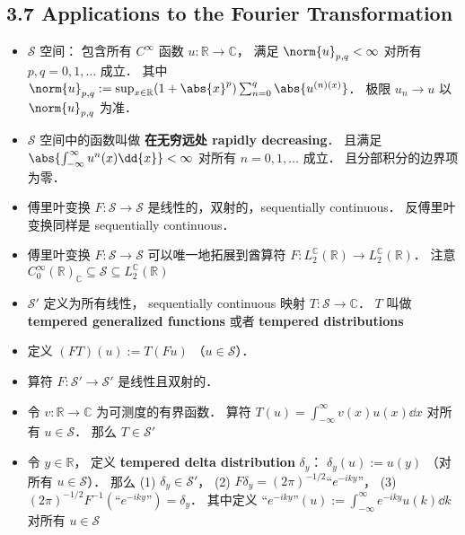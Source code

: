 \subsection{3.7 Applications to the Fourier Transformation}
\begin{itemize}
\item $\mathcal S$ 空间： 包含所有 $C^\infty$ 函数 $u: \mathbb R \to \mathbb C$， 满足 $\norm{u}_{p,q} < \infty$ 对所有 $p, q=0,1,\dots$ 成立． 其中 $\norm{u}_{p,q} := \sup_{x\in\mathbb R} (1+\abs{x}^p) \sum_{n=0}^q\abs{u^{(n)(x)}}$． 极限 $u_n \to u$ 以 $\norm{u}_{p,q}$ 为准．

\item $\mathcal S$ 空间中的函数叫做 \textbf{在无穷远处 rapidly decreasing}． 且满足 $\abs{\int_{-\infty}^\infty u^{n}(x) \dd{x}} < \infty$ 对所有 $n = 0, 1,\dots$ 成立． 且分部积分的边界项为零．

\item 傅里叶变换 $F:\mathcal S\to\mathcal S$ 是线性的，双射的，sequentially continuous． 反傅里叶变换同样是 sequentially continuous．

\item 傅里叶变换 $F:\mathcal S\to\mathcal S$ 可以唯一地拓展到酋算符 $F: L_2^{\mathbb C}(\mathbb R) \to L_2^{\mathbb C}(\mathbb R)$． 注意 $C_0^\infty(\mathbb R)_{\mathbb C} \subseteq \mathcal S \subseteq L_2^{\mathbb C}(\mathbb R)$

\item $\mathcal S'$ 定义为所有线性， sequentially continuous 映射 $T: \mathcal S\to \mathbb C$． $T$ 叫做 \textbf{tempered generalized functions} 或者 \textbf{tempered distributions}

\item 定义 $(FT)(u) := T(Fu)$ （$u \in \mathcal S$）．

\item 算符 $F : \mathcal S' \to \mathcal S'$ 是线性且双射的．

\item 令 $v : \mathbb R\to\mathbb C$ 为可测度的有界函数． 算符 $T(u) = \int_{-\infty}^\infty v(x)u(x) \dd{x}$ 对所有 $u \in \mathcal S$． 那么 $T \in \mathcal S'$

\item 令 $y \in \mathbb R$， 定义 \textbf{tempered delta distribution} $\delta_y$： $\delta_y(u) := u(y)$ （对所有 $u \in \mathcal S$）． 那么 (1) $\delta_y \in \mathcal S'$， (2) $F\delta_y = (2\pi)^{-1/2} “e^{-iky}”$， (3) $(2\pi)^{-1/2} F^{-1} (“e^{-iky}”) = \delta_y$． 其中定义 $“e^{-iky}”(u) := \int_{-\infty}^\infty e^{-iky} u(k) \dd{k}$ 对所有 $u\in\mathcal S$
\end{itemize}


